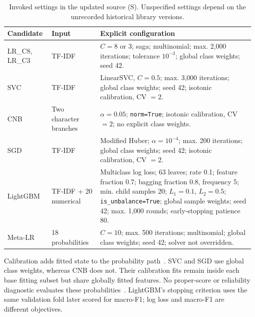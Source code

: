 \documentclass[doublecolumn]{ijcvsplatex}
\begin{document}
\begin{table}[t]
\small\centering
\caption{Invoked settings in the updated source (S). Unspecified settings depend on the unrecorded historical library versions.}
\label{tab:configs}
\begin{tabularx}{\textwidth}{llX}
\toprule
Candidate & Input & Explicit configuration \\
\midrule
LR\_C8, LR\_C3 & TF-IDF & $C=8$ or 3; saga; multinomial; max. 2,000 iterations; tolerance $10^{-3}$; global class weights; seed 42. \\
SVC & TF-IDF & LinearSVC, $C=0.5$; max. 3,000 iterations; global class weights; seed 42; isotonic calibration, CV $=2$. \\
CNB & Two character branches & $\alpha=0.05$; \texttt{norm=True}; isotonic calibration, CV $=2$; no explicit class weights. \\
SGD & TF-IDF & Modified Huber; $\alpha=10^{-4}$; max. 200 iterations; global class weights; seed 42; isotonic calibration, CV $=2$. \\
LightGBM & TF-IDF + 20 numerical & Multiclass log loss; 63 leaves; rate 0.1; feature fraction 0.7; bagging fraction 0.8, frequency 5; min. child samples 20; $L_1=0.1$, $L_2=0.5$; \texttt{is\_unbalance=True}; global sample weights; seed 42; max. 1,000 rounds; early-stopping patience 80. \\
Meta-LR & 18 probabilities & $C=10$; max. 500 iterations; multinomial; global class weights; seed 42; solver not overridden. \\
\bottomrule
\end{tabularx}
\end{table}

Calibration adds fitted state to the probability path~\cite{niculescumizil2005probabilities}. SVC and SGD use global class weights, whereas CNB does not. Their calibration fits remain inside each base fitting subset but share globally fitted features. No proper-score or reliability diagnostic evaluates these probabilities~\cite{vaicenavicius2019calibration}. LightGBM's stopping criterion uses the same validation fold later scored for macro-F1; log loss and macro-F1 are different objectives.
\end{document}
